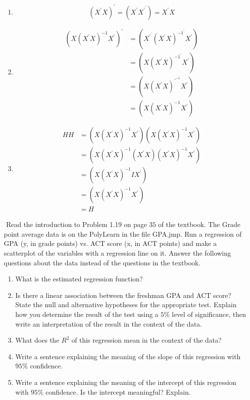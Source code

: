 \documentclass[10pt]{article}
\newenvironment{problem}[2][Problem]{\begin{trivlist}
\item[\hskip \labelsep {\bfseries #1}\hskip \labelsep {\bfseries #2.}]}{\end{trivlist}}
\newenvironment{answer}[2][Answer]{\begin{trivlist}
\item[\hskip \labelsep {\bfseries #1}\hskip \labelsep {\bfseries #2.}]}{\end{trivlist}}
\begin{document}
\begin{answer}{6}
$ $\newline
\begin{enumerate}
    \item 
    \[
    (X^{'}X)^{'} = (X^{'}X^{'^{'}}) = X^{'}X
    \]
    \item
    \begin{equation}
    \begin{split}
    (X(X^{'}X)^{-1}X^{'})^{'} & = (X^{'^{'}}(X^{'}X)^{-1^{'}}X^{'}) \\
    & = (X(X^{'}X)^{-1^{'}}X^{'}) \\
    & = (X(X^{'}X)^{'^{-1}}X^{'}) \\ 
    & = (X(X^{'}X)^{-1}X^{'})
    \end{split}
    \end{equation}
    \item
    \begin{equation}
    \begin{split}
    HH & = (X(X^{'}X)^{-1}X^{'})(X(X^{'}X)^{-1}X^{'}) \\
    & = (X(X^{'}X)^{-1}(X^{'}X)(X^{'}X)^{-1}X^{'}) \\
    & = (X(X^{'}X)^{-1}IX^{'}) \\ 
    & = (X(X^{'}X)^{-1}X^{'}) \\
    & = H
    \end{split}
    \end{equation}
    
\end{enumerate}
\end{answer}

\begin{problem}{7}
$ $\newline
Read the introduction to Problem 1.19 on page $35$ of the textbook.  The Grade point average data is on the PolyLearn in the file GPA.jmp.  Run a regression of GPA (y, in grade points) vs. ACT score (x, in ACT points) and make a scatterplot of the variables with a regression line on it.  Answer the following questions about the data instead of the questions in the textbook.
\begin{enumerate}
    \item What is the estimated regression function?
    \item Is there a linear association between the freshman GPA and ACT score?  State the null and alternative hypotheses for the appropriate test.  Explain how you determine the result of the test using a $5\%$ level of significance, then write an interpretation of the result in the context of the data.
    \item What does the $R^{2}$ of this regression mean in the context of the data?
    \item Write a sentence explaining the meaning of the slope of this regression with $95\%$ confidence.
    \item Write a sentence explaining the meaning of the intercept of this regression with $95\%$ confidence.  Is the intercept meaningful?  Explain.
\end{enumerate}
\end{problem}
\end{document}
